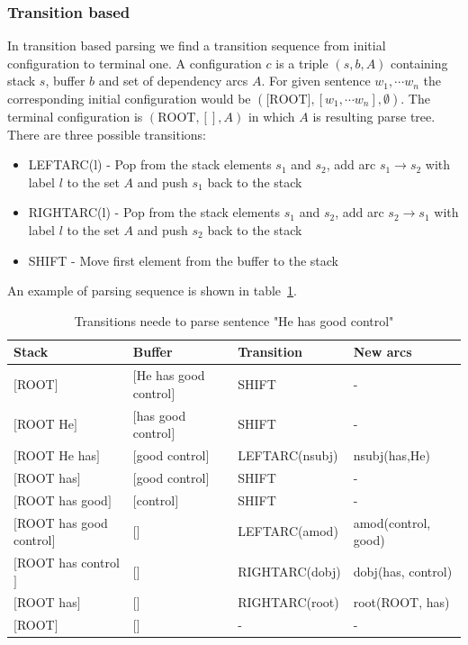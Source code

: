 \subsubsection{Transition based}
In transition based parsing we find a transition sequence from initial configuration
to terminal one. A configuration $c$ is a triple $(s, b, A)$ containing stack $s$,
buffer $b$ and set of dependency arcs $A$. For given sentence $w_1, \cdots w_n$
the corresponding initial configuration would be $(\text{[ROOT]}, [w_1, \cdots w_n], \emptyset)$.
The terminal configuration is $(\text{ROOT}, [], A)$ in which $A$ is resulting parse tree.
There are three possible transitions:
\begin{itemize}
    \item {\ttfamily LEFTARC(l)} - Pop from the stack elements $s_1$ and $s_2$,
        add arc $s_1 \rightarrow s_2$ with label $l$ to the set $A$ and push $s_1$ back
        to the stack
    \item {\ttfamily RIGHTARC(l)} - Pop from the stack elements $s_1$ and $s_2$,
        add arc $s_2 \rightarrow s_1$ with label $l$ to the set $A$ and push $s_2$ back
        to the stack
    \item {\ttfamily SHIFT} - Move first element from the buffer to the stack
\end{itemize}
An example of parsing sequence is shown in table~\ref{tab:transition_parse}.
\begin{table}[!htbp]
    \centering
{\footnotesize
    \begin{tabular}{l | l | l | l}
        Stack & Buffer & Transition & New arcs \\ \hline
        $[$ROOT$]$ & $[$He has good control$]$ & {\ttfamily SHIFT} & - \\
        $[$ROOT He$]$ & $[$has good control$]$ & {\ttfamily SHIFT} & - \\
        $[$ROOT He has$]$ & $[$good control$]$ & {\ttfamily LEFTARC(nsubj)} & nsubj(has,He) \\
        $[$ROOT has$]$ & $[$good control$]$ & {\ttfamily SHIFT} & - \\
        $[$ROOT has good$]$ & $[$control$]$ & {\ttfamily SHIFT} & - \\
        $[$ROOT has good control$]$ & $[$$]$ & {\ttfamily LEFTARC(amod)} & amod(control, good) \\
        $[$ROOT has control$]$ & $[$$]$ & {\ttfamily RIGHTARC(dobj)} & dobj(has, control) \\
        $[$ROOT has$]$ & $[$$]$ & {\ttfamily RIGHTARC(root)} & root(ROOT, has) \\
        $[$ROOT$]$ & $[$$]$ & - & - \\
    \end{tabular}
}
    \caption{Transitions neede to parse sentence "He has good control"}
    \label{tab:transition_parse}
\end{table}

